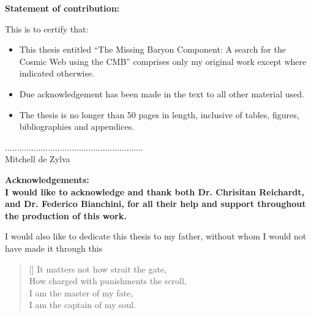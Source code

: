 


\bfseries{Statement of contribution:}\mdseries\\
\vspace{1.0cm}

This is to certify that:\\

\begin{itemize}

\item This thesis entitled ``The Missing Baryon Component: A search for the Cosmic Web using the CMB'' comprises only my original work except where indicated otherwise.

\item Due acknowledgement has been made in the text to all other material used.

\item The thesis is no longer than 50 pages in length, inclusive of tables, figures, bibliographies and
appendices.

\end{itemize}

\vspace{3.0cm}


\scriptsize{..........................................................}\normalsize\\
\newline
\vspace{2.0cm}
\indent Mitchell de Zylva\\
      					 
\vspace{2.0cm}



\bfseries{Acknowledgements:}\mdseries\\

I would like to acknowledge and thank both Dr. Chrisitan Reichardt, and Dr. Federico Bianchini, for all their help and support throughout the production of this work. 

I would also like to dedicate this thesis to my father, without whom I would not have made it through this\\

\settowidth{\versewidth}{How charged with punishments the scroll}
\begin{verse}[\versewidth]
It matters not how strait the gate,\\
      How charged with punishments the scroll,\\
I am the master of my fate,\\
      I am the captain of my soul. 
\end{verse}